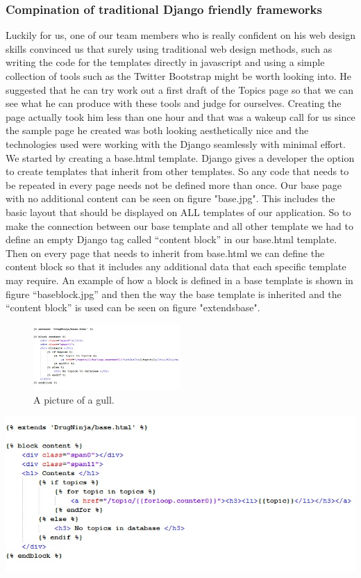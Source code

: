 \documentclass{l3proj}
\begin{document}
{\subsubsection{Compination of traditional Django friendly frameworks}
Luckily for us, one of our team members who is really confident on his web design skills
convinced us that surely using traditional web design methods, such as writing the code for the templates directly in javascript and using a simple collection of tools such as the Twitter Bootstrap might be worth looking into. He suggested that he can try work out a first draft of the Topics page so that we can see what he can produce with these tools and judge for ourselves. Creating the page actually took him less than one hour and that was a wakeup call for us since the sample page he created was both looking aesthetically nice and the technologies used were working with the Django seamlessly with minimal effort.  
We started by creating a base.html template. Django gives a developer the option to create templates that inherit from other templates. So any code that needs to be repeated in every page needs not be defined more than once. Our  base page with no additional content can be seen on figure "base.jpg". This includes the basic layout that should be displayed on ALL templates of our application. So to make the connection between our base template and all other template we had to define an empty Django tag  called “content block” in our base.html template. Then on every page that needs to inherit from base.html we can define the content block so that it includes any additional data that each specific template may require. An example of how a block is defined in a base template is shown in figure “baseblock.jpg” and then the way the base template is inherited and the “content block” is used can be seen on figure "extendsbase".
\begin{figure}[h!]
   \caption{A picture of a gull.}
   \centering
     \includegraphics[width=0.5\textwidth]{images/extendsbase.jpg}
\end{figure}
\includegraphics[width=\linewidth]{images/extendsbase.jpg}
}
\end{document}
